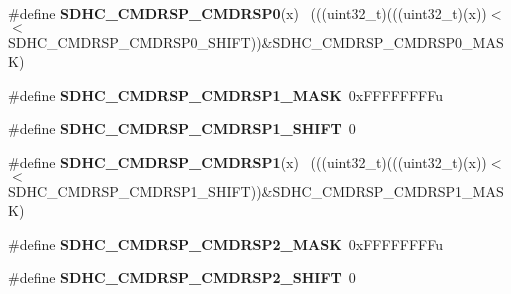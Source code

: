 \begin{DoxyCompactItemize}
\item 
\hypertarget{group___s_d_h_c___register___masks_ga36d10a52098a0cc15350111828da0d6c}{}\#define {\bfseries S\+D\+H\+C\+\_\+\+C\+M\+D\+R\+S\+P\+\_\+\+C\+M\+D\+R\+S\+P0}(x)                                  ~(((uint32\+\_\+t)(((uint32\+\_\+t)(x))$<$$<$S\+D\+H\+C\+\_\+\+C\+M\+D\+R\+S\+P\+\_\+\+C\+M\+D\+R\+S\+P0\+\_\+\+S\+H\+I\+F\+T))\&S\+D\+H\+C\+\_\+\+C\+M\+D\+R\+S\+P\+\_\+\+C\+M\+D\+R\+S\+P0\+\_\+\+M\+A\+S\+K)\label{group___s_d_h_c___register___masks_ga36d10a52098a0cc15350111828da0d6c}

\item 
\hypertarget{group___s_d_h_c___register___masks_gaf2029a539168eda397f19588b928af0f}{}\#define {\bfseries S\+D\+H\+C\+\_\+\+C\+M\+D\+R\+S\+P\+\_\+\+C\+M\+D\+R\+S\+P1\+\_\+\+M\+A\+S\+K}~0x\+F\+F\+F\+F\+F\+F\+F\+Fu\label{group___s_d_h_c___register___masks_gaf2029a539168eda397f19588b928af0f}

\item 
\hypertarget{group___s_d_h_c___register___masks_ga5954455de5b963fe88033ee57abc8682}{}\#define {\bfseries S\+D\+H\+C\+\_\+\+C\+M\+D\+R\+S\+P\+\_\+\+C\+M\+D\+R\+S\+P1\+\_\+\+S\+H\+I\+F\+T}~0\label{group___s_d_h_c___register___masks_ga5954455de5b963fe88033ee57abc8682}

\item 
\hypertarget{group___s_d_h_c___register___masks_ga599754fce479e55f6ed88bd1f5b9c9e8}{}\#define {\bfseries S\+D\+H\+C\+\_\+\+C\+M\+D\+R\+S\+P\+\_\+\+C\+M\+D\+R\+S\+P1}(x)                                  ~(((uint32\+\_\+t)(((uint32\+\_\+t)(x))$<$$<$S\+D\+H\+C\+\_\+\+C\+M\+D\+R\+S\+P\+\_\+\+C\+M\+D\+R\+S\+P1\+\_\+\+S\+H\+I\+F\+T))\&S\+D\+H\+C\+\_\+\+C\+M\+D\+R\+S\+P\+\_\+\+C\+M\+D\+R\+S\+P1\+\_\+\+M\+A\+S\+K)\label{group___s_d_h_c___register___masks_ga599754fce479e55f6ed88bd1f5b9c9e8}

\item 
\hypertarget{group___s_d_h_c___register___masks_ga60782d85358658786d1a76fe99379622}{}\#define {\bfseries S\+D\+H\+C\+\_\+\+C\+M\+D\+R\+S\+P\+\_\+\+C\+M\+D\+R\+S\+P2\+\_\+\+M\+A\+S\+K}~0x\+F\+F\+F\+F\+F\+F\+F\+Fu\label{group___s_d_h_c___register___masks_ga60782d85358658786d1a76fe99379622}

\item 
\hypertarget{group___s_d_h_c___register___masks_ga68102815f97db907271c9feb9b35d48f}{}\#define {\bfseries S\+D\+H\+C\+\_\+\+C\+M\+D\+R\+S\+P\+\_\+\+C\+M\+D\+R\+S\+P2\+\_\+\+S\+H\+I\+F\+T}~0\label{group___s_d_h_c___register___masks_ga68102815f97db907271c9feb9b35d48f}


\end{DoxyCompactItemize}
